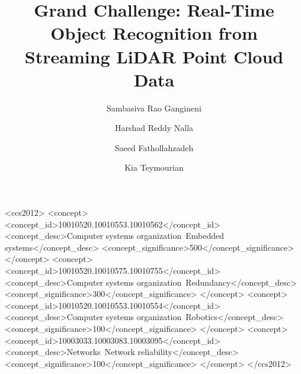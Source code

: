 \documentclass[sigconf]{acmart}
\begin{document}
%

\title[Real-Time Object Recognition from Streaming LiDAR Point Cloud Data]{Grand Challenge: Real-Time Object Recognition from Streaming LiDAR Point Cloud Data}


%


\author{Sambasiva Rao Gangineni}

\author{Harshad Reddy Nalla}


\author{Saeed Fathollahzadeh}

\author{Kia Teymourian}



%
\renewcommand{\shortauthors}{Gangineni, et al.}

\begin{CCSXML}
	<ccs2012>
	<concept>
	<concept_id>10010520.10010553.10010562</concept_id>
	<concept_desc>Computer systems organization~Embedded systems</concept_desc>
	<concept_significance>500</concept_significance>
	</concept>
	<concept>
	<concept_id>10010520.10010575.10010755</concept_id>
	<concept_desc>Computer systems organization~Redundancy</concept_desc>
	<concept_significance>300</concept_significance>
	</concept>
	<concept>
	<concept_id>10010520.10010553.10010554</concept_id>
	<concept_desc>Computer systems organization~Robotics</concept_desc>
	<concept_significance>100</concept_significance>
	</concept>
	<concept>
	<concept_id>10003033.10003083.10003095</concept_id>
	<concept_desc>Networks~Network reliability</concept_desc>
	<concept_significance>100</concept_significance>
	</concept>
	</ccs2012>
\end{CCSXML}
\end{document}
